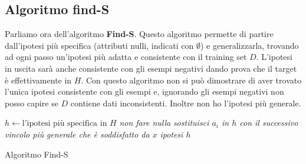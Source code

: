 \subsection{Algoritmo find-S}
Parliamo ora dell'algoritmo \textbf{Find-S}. Questo algoritmo permette di
partire dall'ipotesi più specifica (attributi nulli, indicati con
$\emptyset$) e generalizzarla, 
trovando ad ogni passo un'ipotesi più adatta e consistente con il training
set $D$. L'ipotesi in uscita sarà anche consistente con gli esempi negativi
dando prova che il target è effettivamente in $H$. Con questo algoritmo non si
può dimostrare di aver trovato l'unica ipotesi consistente con gli esempi e,
ignorando gli esempi negativi non posso capire se $D$ contiene dati
inconsistenti. Inoltre non ho l'ipotesi più generale.
\begin{algorithm}[H]
  \begin{algorithmic}
    \State $h\gets \mbox{l'ipotesi più specifica in } H$
    \State \textit{non fare nulla}
    \Else
    \State \textit{sostituisci $a_i$ in $h$ con il successivo vincolo più}
    \State \textit{generale che è soddisfatto da $x$}
    \EndIf
    \EndFor
    \EndFor
    \Return \textit{ipotesi $h$}
    \EndFunction
  \end{algorithmic}
  \caption{Algoritmo Find-S}
\end{algorithm}
